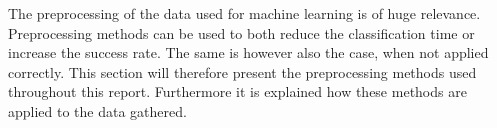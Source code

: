 The preprocessing of the data used for machine learning is of huge relevance.
Preprocessing methods can be used to both reduce the classification time or increase the success rate.
The same is however also the case, when not applied correctly.
This section will therefore present the preprocessing methods used throughout this report.
Furthermore it is explained how these methods are applied to the data gathered.